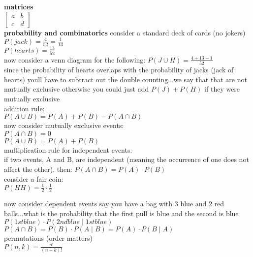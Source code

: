 \documentclass{article}
\begin{document}
\textbf{matrices}\\
$
\begin{bmatrix}
a & b\\
c & d
\end{bmatrix}
$\\

\textbf{probability and combinatorics}
consider a standard deck of cards (no jokers)\\
$P(jack) = \frac{4}{52} = \frac{1}{13}$\\
$P(hearts) = \frac{13}{52}$\\

now consider a venn diagram for the following:
$P(J \cup H) = \frac{4 + 13 - 1}{52}$\\
since the probability of hearts overlaps with the probability of jacks (jack of hearts) youll have to subtract out the double counting...we say that that are not mutually exclusive otherwise you could just add $P(J) + P(H)$ if they were mutually exclusive\\

addition rule:\\
$P(A \cup B) = P(A) + P(B) - P(A \cap B)$\\

now consider mutually exclusive events:\\
$P(A \cap B) = 0$\\
$P(A \cup B) = P(A) + P(B)$\\

multiplication rule for independent events:\\
if two events, A and B, are independent (meaning the occurrence of one does not affect the other), then: $P(A \cap B) = P(A) \cdot P(B)$\\

consider a fair coin:\\
$P(HH) = \frac{1}{2} \cdot \frac{1}{2}$

now consider dependent events say you have a bag with 3 blue and 2 red balls...what is the probability that the first pull is blue and the second is blue\\
$P(1st blue) \cdot P(2nd blue \mid 1st blue)$\\

$P(A \cap B) = P(B) \cdot P(A \mid B) = P(A) \cdot P(B \mid A)$\\

permutations (order matters)\\
$P(n, k) = \frac{n!}{(n - k)!}$\\
\end{document}
